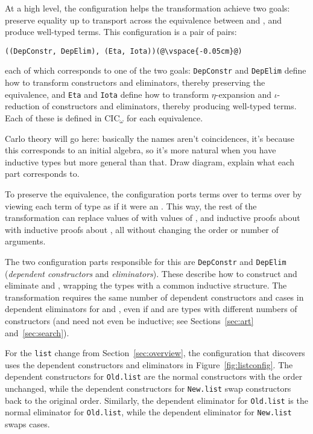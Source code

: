 At a high level, the configuration helps the transformation achieve two goals: preserve equality up to transport across the equivalence 
between \Aa and \B, and produce well-typed terms.
This configuration is a pair of pairs:

\begin{lstlisting}
((DepConstr, DepElim), (Eta, Iota))(@\vspace{-0.05cm}@)
\end{lstlisting}
each of which corresponds to one of the two goals:
\lstinline{DepConstr} and \lstinline{DepElim} define how to transform constructors and eliminators, thereby preserving the equivalence, and 
\lstinline{Eta} and \lstinline{Iota} define how to transform $\eta$-expansion and $\iota$-reduction of constructors and eliminators, thereby producing well-typed terms.
Each of these is defined in CIC$_{\omega}$ for each equivalence.

Carlo theory will go here: basically the names aren't coincidences, it's because this corresponds
to an initial algebra, so it's more natural when you have inductive types but more general than that.
Draw diagram, explain what each part corresponds to.

To preserve the equivalence, the configuration ports terms over \Aa to terms over \B by viewing each
term of type \B as if it were an \Aa.
This way, the rest of the transformation can replace values of \Aa with values of \B, and
inductive proofs about \Aa with inductive proofs about \B, %
all without changing the order or number of arguments.

The two configuration parts responsible for this are \lstinline{DepConstr}
and \lstinline{DepElim} (\textit{dependent constructors} and \textit{eliminators}).
These describe how to construct and eliminate \Aa and \B, wrapping the types with a common inductive structure.
The transformation requires the same number of dependent constructors and cases in dependent eliminators for \Aa and \B,
even if \Aa and \B are types with different numbers of constructors
(\Aa and \B need not even be inductive; see Sections~\ref{sec:art} and~\ref{sec:search}).

For the \lstinline{list} change from Section~\ref{sec:overview},
the configuration that \toolnamec discovers uses the dependent constructors
and eliminators in Figure~\ref{fig:listconfig}. The dependent constructors for \lstinline{Old.list}
are the normal constructors with the order unchanged,
while the dependent constructors for \lstinline{New.list} swap constructors
back to the original order.
Similarly, the dependent eliminator for \lstinline{Old.list} is the normal eliminator for \lstinline{Old.list},
while the dependent eliminator for \lstinline{New.list} swaps cases.

